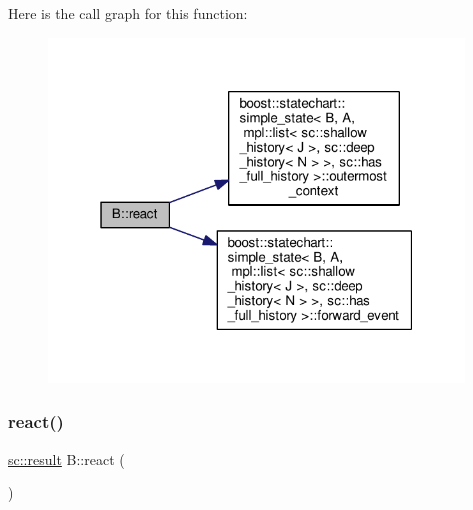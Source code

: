 Here is the call graph for this function\+:
\nopagebreak
\begin{figure}[H]
\begin{center}
\leavevmode
\includegraphics[width=313pt]{struct_b_add69d6626a14cef8f58929dfbe940cb9_cgraph}
\end{center}
\end{figure}
\mbox{\label{struct_b_af883c81d64b442ed4252a406a2710459}} 
\subsubsection{\texorpdfstring{react()}{react()}\hspace{0.1cm}{\footnotesize\ttfamily [2/3]}}
{\footnotesize\ttfamily \mbox{\hyperlink{namespaceboost_1_1statechart_abe807f6598b614d6d87bb951ecd92331}{sc\+::result}} B\+::react (\begin{DoxyParamCaption}\item[{const \mbox{\hyperlink{struct_ev_discard_in_b}{Ev\+Discard\+InB}} \&}]{ }\end{DoxyParamCaption})\hspace{0.3cm}{\ttfamily [inline]}}

